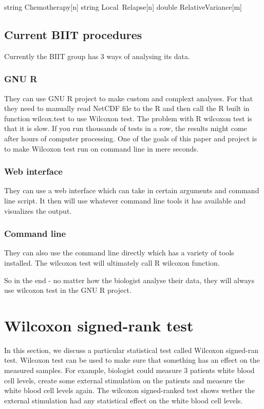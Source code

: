 \documentclass[12pt]{article}
\begin{document}
string Chemotherapy[n]
string Local\ Relapse[n]
double RelativeVariance[m]

\subsection{Current BIIT procedures}
Currently the BIIT group has 3 ways of analysing its data.
\subsubsection{GNU R}
They can use GNU R project to make custom and complext analyses. For that they need to manually read NetCDF file to the R and then call the R built in function wilcox.test to use Wilcoxon test. The problem with R wilcoxon test is that it is slow. If you run thousands of tests in a row, the results might come after hours of computer processing. One of the goals of this paper and project is to make Wilcoxon test run on command line in mere seconds.
\subsubsection{Web interface}
They can use a web interface which can take in certain arguments and command line script. It then will use whatever command line tools it has available and visualizes the output.

\subsubsection{Command line}
They can also use the command line directly which has a variety of tools installed. The wilcoxon test will ultimately call R wilcoxon function.

So in the end - no matter how the biologist analyse their data, they will always use wilcoxon test in the GNU R project.

\newpage

\section{Wilcoxon signed-rank test}

In this section, we discuss a particular statistical test called Wilcoxon signed-ran test. Wilcoxon test can be used to make sure that something has an effect on the measured samples. For example, biologist could measure 3 patients white blood cell levels, create some external stimulation on the patients and measure the white blood cell levels again. The wilcoxon signed-ranked test shows wether the external stimulation had any statistical effect on the white blood cell levels.
\end{document}
